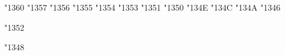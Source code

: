 \def\mathbotsmash@AmS#1#2{\setbox0=\hbox{$#1{#2}$}\botsmash@@AmS}

\def\botsmash@@AmS{\vbox to \ht0{\box0\vss}}




\def\LimitsOnSums{\let\slimits@AmS=\displaylimits}                    %
\def\NoLimitsOnSums{\let\slimits@AmS=\nolimits}

\LimitsOnSums

\mathchardef\coprod@AmS"1360       \def\coprod{\coprod@AmS\slimits@AmS}
\mathchardef\bigvee@AmS"1357       \def\bigvee{\bigvee@AmS\slimits@AmS}
\mathchardef\bigwedge@AmS"1356     \def\bigwedge{\bigwedge@AmS\slimits@AmS}
\mathchardef\biguplus@AmS"1355     \def\biguplus{\biguplus@AmS\slimits@AmS}
\mathchardef\bigcap@AmS"1354       \def\bigcap{\bigcap@AmS\slimits@AmS}
\mathchardef\bigcup@AmS"1353       \def\bigcup{\bigcup@AmS\slimits@AmS}
\mathchardef\prod@AmS"1351         \def\prod{\prod@AmS\slimits@AmS}
\mathchardef\sum@AmS"1350          \def\sum{\sum@AmS\slimits@AmS}
\mathchardef\bigotimes@AmS"134E    \def\bigotimes{\bigotimes@AmS\slimits@AmS}
\mathchardef\bigoplus@AmS"134C     \def\bigoplus{\bigoplus@AmS\slimits@AmS}
\mathchardef\bigodot@AmS"134A      \def\bigodot{\bigodot@AmS\slimits@AmS}
\mathchardef\bigsqcup@AmS"1346     \def\bigsqcup{\bigsqcup@AmS\slimits@AmS}


\def\LimitsOnInts{\let\ilimits@AmS=\displaylimits}
\def\NoLimitsOnInts{\let\ilimits@AmS=\nolimits}

\NoLimitsOnInts

\mathchardef\int@AmS"1352
\def\int{\gdef\intflag@AmS{T}\int@AmS\ilimits@AmS}                    %

\mathchardef\oint@AmS"1348 \def\oint{\gdef\intflag@AmS{T}\oint@AmS\ilimits@AmS}

\def\inttest@AmS#1{\def\intflag@AmS{F}\setbox0=\hbox{$#1$}}


\def\intic@AmS{\mathchoice{\hbox{\hskip5pt}}{\hbox
          {\hskip4pt}}{\hbox{\hskip4pt}}{\hbox{\hskip4pt}}}           %
\def\negintic@AmS{\mathchoice
  {\hbox{\hskip-5pt}}{\hbox{\hskip-4pt}}{\hbox{\hskip-4pt}}{\hbox{\hskip-4pt}}}
\def\intkern@AmS{\mathchoice{\!\!\!}{\!\!}{\!\!}{\!\!}}
\def\intdots@AmS{\mathchoice{\cdots}{{\cdotp}\mkern 1.5mu
    {\cdotp}\mkern 1.5mu{\cdotp}}{{\cdotp}\mkern 1mu{\cdotp}\mkern 1mu
      {\cdotp}}{{\cdotp}\mkern 1mu{\cdotp}\mkern 1mu{\cdotp}}}

\newcount\intno@AmS                                                   %

